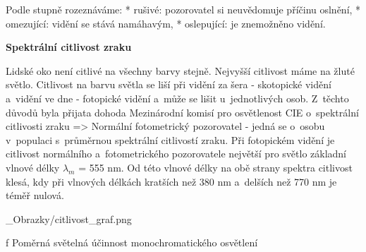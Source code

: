 \medskip\noindent
Podle stupně rozeznáváme:
\begitems
* {\sbf rušivé:} pozorovatel si neuvědomuje příčinu oslnění,
* {\sbf omezující:} vidění se stává namáhavým,
* {\sbf oslepující:} je znemožněno vidění.
\enditems

\medskip\noindent
{\bf Spektrální citlivost zraku}

Lidské oko není citlivé na všechny barvy stejně. Nejvyšší citlivost máme na žluté světlo. Citlivost na barvu
světla se liší při vidění za šera - skotopické vidění a~vidění ve dne - fotopické vidění a~může se lišit
u~jednotlivých osob.
Z~těchto důvodů byla přijata dohoda Mezinárodní komisí pro osvětlenost CIE o~spektrální
citlivosti zraku => {\sbf Normální fotometrický pozorovatel} - jedná se o~osobu v~populaci s~průměrnou
spektrální citlivostí zraku. Při fotopickém vidění je citlivost normálního a~fotometrického pozorovatele
největší pro světlo základní vlnové délky $λ_m$ = 555 nm. Od této vlnové délky na obě strany spektra
citlivost klesá, kdy při vlnových délkách kratších než 380 nm a~delších než 770 nm je téměř nulová.

\medskip

\medskip {}
\picw=12cm _Obrazky/citlivost_graf.png
\caption/f Poměrná světelná účinnost monochromatického osvětlení


